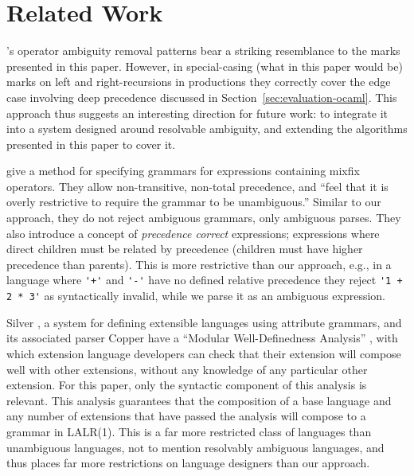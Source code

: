 \documentclass[acmsmall,review,anonymous]{acmart}\settopmatter{printfolios=true,printccs=false,printacmref=false}
\begin{document}
\section{Related Work}

\citet{afroozehSafeSpecificationOperator2013}'s operator ambiguity removal patterns bear a striking resemblance to the marks presented in this paper. However, in special-casing (what in this paper would be) marks on left and right-recursions in productions they correctly cover the edge case involving deep precedence discussed in Section~\ref{sec:evaluation-ocaml}. This approach thus suggests an interesting direction for future work: to integrate it into a system designed around resolvable ambiguity, and extending the algorithms presented in this paper to cover it.

\citet{danielssonParsingMixfixOperators2011} give a method for specifying grammars for expressions containing mixfix operators. They allow non-transitive, non-total precedence, and ``feel that it is overly restrictive to require the grammar to be unambiguous.'' Similar to our approach, they do not reject ambiguous grammars, only ambiguous parses. They also introduce a concept of \emph{precedence correct} expressions; expressions where direct children must be related by precedence (children must have higher precedence than parents). This is more restrictive than our approach, e.g., in a language where \verb|'+'| and \verb|'-'| have no defined relative precedence they reject \verb|'1 + 2 * 3'| as syntactically invalid, while we parse it as an ambiguous expression.

Silver \cite{vanwykSilverExtensibleAttribute2010}, a system for defining extensible languages using attribute grammars, and its associated parser Copper \cite{vanwykCopper2007} have a ``Modular Well-Definedness Analysis'' \cite{kaminskiModularWellDefinednessAnalysis2013}, with which extension language developers can check that their extension will compose well with other extensions, without any knowledge of any particular other extension. For this paper, only the syntactic component \cite{schwerdfegerVerifiableCompositionDeterministic2009} of this analysis is relevant. This analysis guarantees that the composition of a base language and any number of extensions that have passed the analysis will compose to a grammar in LALR(1). This is a far more restricted class of languages than unambiguous languages, not to mention resolvably ambiguous languages, and thus places far more restrictions on language designers than our approach.
\end{document}
